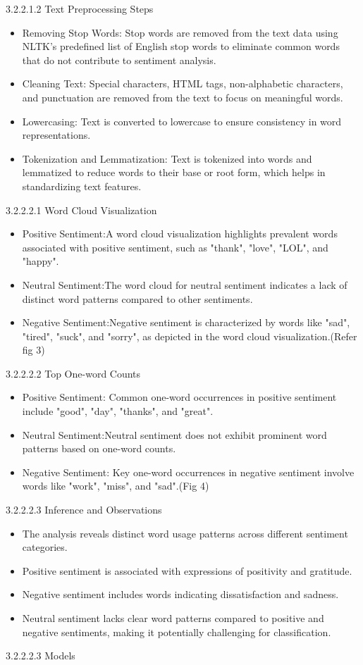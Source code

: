 \documentclass[a4paper]{article}
\theoremstyle{plain}
\theoremstyle{definition}
\begin{document}
3.2.2.1.2 Text Preprocessing Steps
\begin{itemize}
    \item {Removing Stop Words:} Stop words are removed from the text data using NLTK's predefined list of English stop words to eliminate common words that do not contribute to sentiment analysis.
    \item{Cleaning Text:} Special characters, HTML tags, non-alphabetic characters, and punctuation are removed from the text to focus on meaningful words.
    \item {Lowercasing:} Text is converted to lowercase to ensure consistency in word representations.
    \item {Tokenization and Lemmatization:} Text is tokenized into words and lemmatized to reduce words to their base or root form, which helps in standardizing text features.
\end{itemize} 
\item{3.2.2.2.1 Word Cloud Visualization}\newline
\begin{itemize}
    \item{Positive Sentiment}:A word cloud visualization highlights prevalent words associated with positive sentiment, such as "thank", "love", "LOL", and "happy".
    \item{Neutral Sentiment}:The word cloud for neutral sentiment indicates a lack of distinct word patterns compared to other sentiments.
    \item{Negative Sentiment}:Negative sentiment is characterized by words like "sad", "tired", "suck", and "sorry", as depicted in the word cloud visualization.(Refer fig 3)
    \end{itemize}
{3.2.2.2.2 Top One-word Counts} \newline
\begin{itemize}
    \item {Positive Sentiment}: Common one-word occurrences in positive sentiment include "good", "day", "thanks", and "great".
    \item {Neutral Sentiment}:Neutral sentiment does not exhibit prominent word patterns based on one-word counts.
    \item {Negative Sentiment}: Key one-word occurrences in negative sentiment involve words like "work", "miss", and "sad".(Fig 4)
\end{itemize}

{3.2.2.2.3 Inference and Observations}
\begin{itemize}
    \item The analysis reveals distinct word usage patterns across different sentiment categories.
    \item Positive sentiment is associated with expressions of positivity and gratitude.
    \item Negative sentiment includes words indicating dissatisfaction and sadness.
    \item Neutral sentiment lacks clear word patterns compared to positive and negative sentiments, making it potentially challenging for classification.
\end{itemize}
3.2.2.2.3 Models \newline
\end{document}
